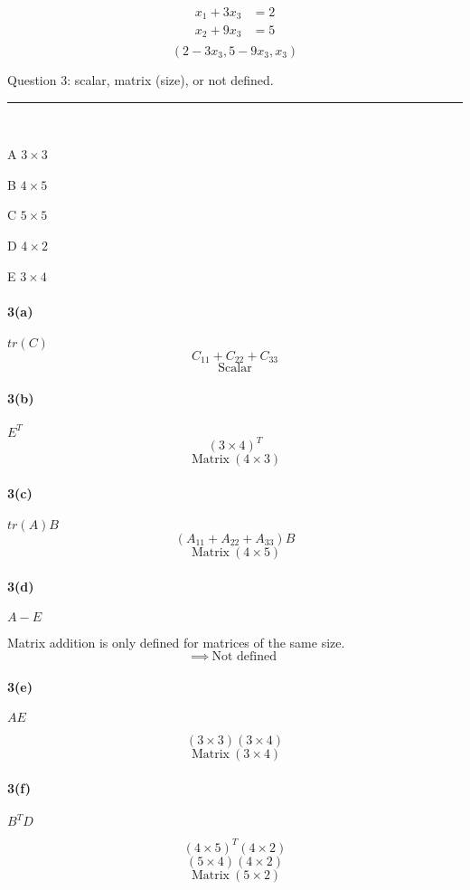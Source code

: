 \documentclass[a4paper,11pt,twoside]{report}
\begin{document}
\begin{align*}
	x_1 + 3 x_3 &= 2 \\
	x_2 + 9x_3 &= 5 \\
\end{align*}
\[\boxed{(2 - 3x_3, 5 - 9x_3, x_3)}\]

\noindent Question 3: scalar, matrix (size), or not defined. \\ \hrule
\

A $3\times 3$

B $4 \times 5$

C $5 \times 5$

D $4 \times 2$

E $3 \times 4$

\paragraph{3(a)} $tr(C)$
\[C_{11}+ C_{22}+C_{33}\]
\[\boxed{\:\text{Scalar}\:}\]

\paragraph{3(b)} $E^{T}$
\[(3\times 4)^{T}\]
\[\boxed{\:\text{Matrix}\:(4\times 3)}\]

\paragraph{3(c)}$tr(A)B$
\[(A_{11}+A_{22}+A_{33})B\]
\[\boxed{\:\text{Matrix}\:(4\times 5)}\]

\paragraph{3(d)}$A-E$

Matrix addition is only defined for matrices of the same size. \[\implies\boxed{\:\text{Not defined}\:}\]

\paragraph{3(e)}$AE$

\[(3\times 3)(3\times 4)\]
\[\boxed{\:\text{Matrix}\:(3\times 4)}\]

\paragraph{3(f)}$B^{T}D$

\[(4\times 5)^{T}(4\times 2)\]
\[(5\times 4)(4\times 2)\]
\[\boxed{\:\text{Matrix}\:(5\times 2)}\]
\end{document}
